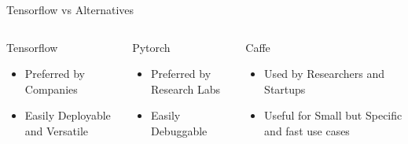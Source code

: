 \documentclass{beamer}
\begin{document}
\begin{frame}[fragile]{Tensorflow vs Alternatives}
\begin{columns}[T]
 \begin{column}{.33\textwidth}
     \begin{block}{Tensorflow}
     \begin{itemize}
     \item Preferred by Companies
     \item Easily Deployable and Versatile
    \end{itemize}
     \end{block}
   \end{column}
   
    \begin{column}{.33\textwidth}
     \begin{block}{Pytorch}
     \begin{itemize}
     \item Preferred by Research Labs
     \item Easily Debuggable
    \end{itemize}
     \end{block}
   \end{column}
   
   \begin{column}{.33\textwidth}
     \begin{block}{Caffe}
     \begin{itemize}
     \item Used by Researchers and Startups
     \item Useful for Small but Specific and fast use cases
    \end{itemize}
     \end{block}
   \end{column}

\end{columns}
\end{frame}
\end{document}
